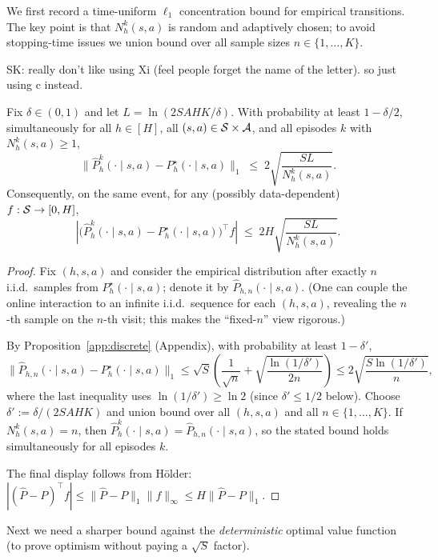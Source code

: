 We first record a time-uniform $\ell_1$ concentration bound for empirical transitions.
The key point is that $N_h^k(s,a)$ is random and adaptively chosen; to avoid stopping-time
issues we union bound over all sample sizes $n\in\{1,\dots,K\}$.

SK: really don't like using Xi (feel people forget the name of the letter). so just using c instead.

\begin{lemma}
\label{lem:ucbvi_l1}
Fix $\delta\in(0,1)$ and let $L=\ln(2SAHK/\delta)$.
With probability at least $1-\delta/2$, simultaneously for all $h\in[H]$, all $(s,a)\in\mathcal{S}\times\mathcal{A}$,
and all episodes $k$ with $N_h^k(s,a)\ge 1$,
\[
\big\|\widehat P_h^k(\cdot\mid s,a)-P_h^\star(\cdot\mid s,a)\big\|_1
\;\le\;
2\sqrt{\frac{S L}{N_h^k(s,a)}}.
\]
Consequently, on the same event, for any (possibly data-dependent) $f:\mathcal{S}\to[0,H]$,
\[
\left|\big(\widehat P_h^k(\cdot\mid s,a)-P_h^\star(\cdot\mid s,a)\big)^\top f\right|
\;\le\;
2H\sqrt{\frac{S L}{N_h^k(s,a)}}.
\]
\end{lemma}

\begin{proof}
Fix $(h,s,a)$ and consider the empirical distribution after exactly $n$ i.i.d.\ samples
from $P_h^\star(\cdot\mid s,a)$; denote it by $\widehat P_{h,n}(\cdot\mid s,a)$.
(One can couple the online interaction to an infinite i.i.d.\ sequence for each $(h,s,a)$,
revealing the $n$-th sample on the $n$-th visit; this makes the ``fixed-$n$'' view rigorous.)

By Proposition~\ref{app:discrete} (Appendix), with probability at least $1-\delta'$,
\[
\big\|\widehat P_{h,n}(\cdot\mid s,a)-P_h^\star(\cdot\mid s,a)\big\|_1
\le \sqrt{S}\left(\frac{1}{\sqrt{n}} + \sqrt{\frac{\ln(1/\delta')}{2n}}\right)
\le 2\sqrt{\frac{S\ln(1/\delta')}{n}},
\]
where the last inequality uses $\ln(1/\delta')\ge \ln 2$ (since $\delta'\le 1/2$ below).
Choose $\delta' := \delta/(2SAHK)$ and union bound over all $(h,s,a)$ and all $n\in\{1,\dots,K\}$.
If $N_h^k(s,a)=n$, then $\widehat P_h^k(\cdot\mid s,a)=\widehat P_{h,n}(\cdot\mid s,a)$,
so the stated bound holds simultaneously for all episodes $k$.

The final display follows from H\"older:
$|(\widehat P-P)^\top f|\le \|\widehat P-P\|_1\|f\|_\infty\le H\|\widehat P-P\|_1$.
\end{proof}

Next we need a sharper bound against the \emph{deterministic} optimal value function
(to prove optimism without paying a $\sqrt{S}$ factor).

